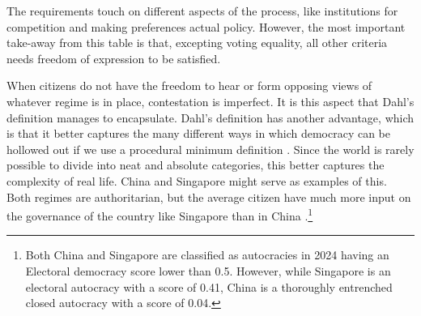 The requirements touch on different aspects of the process, like institutions for competition and making preferences actual policy. However, the most important take-away from this table is that, excepting voting equality, all other criteria needs freedom of expression to be satisfied.

When citizens do not have the freedom to hear or form opposing views of whatever regime is in place, contestation is imperfect. It is this aspect that Dahl's definition manages to encapsulate. Dahl's definition has another advantage, which is that it better captures the many different ways in which democracy can be hollowed out if we use a procedural minimum definition \citep{varol_stealth_2015}. Since the world is rarely possible to divide into neat and absolute categories, this better captures the complexity of real life. China and Singapore might serve as examples of this. Both regimes are authoritarian, but the average citizen have much more input on the governance of the country like Singapore than in China \citep[pp. 62-63]{nord_democracy_2025}.\footnote{Both China and Singapore are classified as autocracies in 2024 having an Electoral democracy score lower than 0.5. However,  while Singapore is an electoral autocracy \citep[p. 14]{nord_democracy_2025} with a score of 0.41, China is a thoroughly entrenched closed autocracy with a score of 0.04.\citep{nord_democracy_2025}} 

